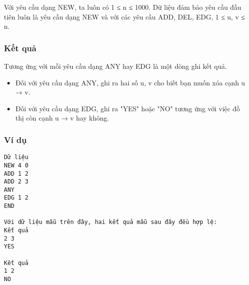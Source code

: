    Với yêu cầu dạng NEW, ta luôn có 1 ≤ n ≤ 1000. Dữ liệu đảm bảo yêu cầu đầu tiên luôn là yêu cầu dạng NEW và với các yêu cầu ADD, DEL, EDG, 1 ≤ u, v ≤ n.  

\subsubsection{   Kết quả  }

   Tương ứng với mỗi yêu cầu dạng ANY hay EDG là một dòng ghi kết quả.  
\begin{itemize}
	\item     Đối với yêu cầu dạng ANY, ghi ra hai số u, v cho biết bạn muốn xóa cạnh u → v.   
	\item     Đối với yêu cầu dạng EDG, ghi ra "YES" hoặc "NO" tương ứng với việc đồ thị còn cạnh u → v hay không.   
\end{itemize}

\subsubsection{   Ví dụ  }
\begin{verbatim}
Dữ liệu
NEW 4 0
ADD 1 2
ADD 2 3
ANY
EDG 1 2
END

Với dữ liệu mẫu trên đây, hai kết quả mẫu sau đây đều hợp lệ:
Kết quả
2 3
YES

Kết quả
1 2
NO
\end{verbatim}
